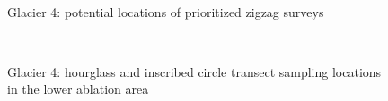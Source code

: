 \documentclass{sfuthesis}
\begin{document}
{\begin{appendices}
	\begin{figure}[H]
	\centering
	\\
\caption[]{Glacier 4: potential locations of prioritized zigzag surveys}
\end{figure}
	\begin{figure}[H]
	\centering
	\\
\caption[]{Glacier 4: hourglass and inscribed circle transect sampling locations in the lower ablation area}
\end{figure}
	\begin{figure}[H]
	\centering

\end{figure}
\end{appendices}}
\end{document}
